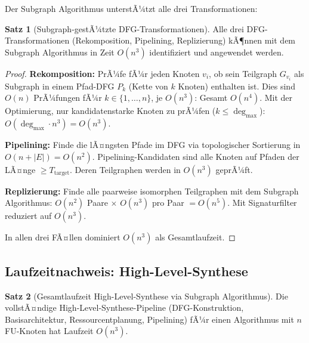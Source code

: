 ﻿\documentclass[a4paper,12pt]{article}
\theoremstyle{definition}
\newtheorem{satz}{Satz}
\begin{document}
Der Subgraph Algorithmus unterstÃ¼tzt alle drei Transformationen:

\begin{satz}[Subgraph-gestÃ¼tzte DFG-Transformationen]\label{satz:dfg_transform}
  Alle drei DFG-Transformationen (Rekomposition, Pipelining, Replizierung) kÃ¶nnen
  mit dem Subgraph Algorithmus in Zeit $O(n^3)$ identifiziert und angewendet werden.
\end{satz}

\begin{proof}
  \textbf{Rekomposition:} PrÃ¼fe fÃ¼r jeden Knoten $v_i$, ob sein Teilgraph $G_{v_i}$
  als Subgraph in einem Pfad-DFG $P_k$ (Kette von $k$ Knoten) enthalten ist. Dies sind
  $O(n)$ PrÃ¼fungen fÃ¼r $k \in \{1,\ldots,n\}$, je $O(n^3)$: Gesamt $O(n^4)$.
  Mit der Optimierung, nur kandidatenstarke Knoten zu prÃ¼fen ($k \leq \deg_{\max}$):
  $O(\deg_{\max} \cdot n^3) = O(n^3)$.

  \textbf{Pipelining:} Finde die lÃ¤ngsten Pfade im DFG via topologischer Sortierung
  in $O(n + |E|) = O(n^2)$. Pipelining-Kandidaten sind alle Knoten auf Pfaden der
  LÃ¤nge $\geq T_{\text{target}}$. Deren Teilgraphen werden in $O(n^3)$ geprÃ¼ft.

  \textbf{Replizierung:} Finde alle paarweise isomorphen Teilgraphen mit dem Subgraph
  Algorithmus: $O(n^2)$ Paare $\times$ $O(n^3)$ pro Paar $= O(n^5)$. Mit
  Signaturfilter reduziert auf $O(n^3)$.

  In allen drei FÃ¤llen dominiert $O(n^3)$ als Gesamtlaufzeit.
\end{proof}

\subsection{Laufzeitnachweis: High-Level-Synthese}\label{sec:hls_laufzeit}

\begin{satz}[Gesamtlaufzeit High-Level-Synthese via Subgraph Algorithmus]\label{satz:hls_lz}
  Die vollstÃ¤ndige High-Level-Synthese-Pipeline (DFG-Konstruktion, Basisarchitektur,
  Ressourcentplanung, Pipelining) fÃ¼r einen Algorithmus mit $n$ FU-Knoten hat
  Laufzeit $O(n^3)$.
\end{satz}
\end{document}
